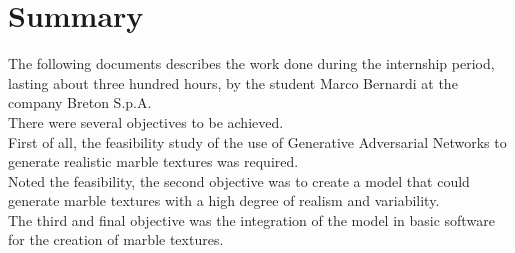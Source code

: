 \cleardoublepage
{}
{}
\begingroup
\let\clearpage\relax
\let\cleardoublepage\relax
\let\cleardoublepage\relax

\chapter*{Summary}

The following documents describes the work done during the internship period, lasting about three hundred hours, by the student Marco Bernardi at the company Breton S.p.A.\\
There were several objectives to be achieved.\\
First of all, the feasibility study of the use of Generative Adversarial Networks to generate realistic marble textures was required.\\
Noted the feasibility, the second objective was to create a model that could generate marble textures with a high degree of realism and variability.\\
The third and final objective was the integration of the model in basic software for the creation of marble textures.\\




\endgroup

\vfill
